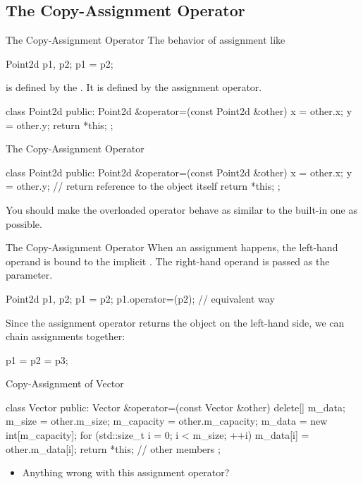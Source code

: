 \documentclass{beamer}
\begin{document}
\subsection{The Copy-Assignment Operator}

\begin{frame}[fragile]{The Copy-Assignment Operator}
    The behavior of assignment like
    \begin{cpp}
Point2d p1, p2;
p1 = p2;
    \end{cpp}
    is defined by the . It is defined by  the assignment operator.
    \begin{cpp}
class Point2d {
 public:
  Point2d &operator=(const Point2d &other) {
    x = other.x;
    y = other.y;
    return *this;
  }
};
    \end{cpp}
\end{frame}

\begin{frame}[fragile]{The Copy-Assignment Operator}
    \begin{cpp}
class Point2d {
 public:
  Point2d &operator=(const Point2d &other) {
    x = other.x;
    y = other.y;
    // return reference to the object itself
    return *this;
  }
};
    \end{cpp}
    \begin{notice}
        You should make the overloaded operator behave as similar to the built-in one as possible.
    \end{notice}
\end{frame}

\begin{frame}[fragile]{The Copy-Assignment Operator}
    When an assignment happens, the left-hand operand is bound to the implicit . The right-hand operand is passed as the parameter.
    \begin{cpp}
Point2d p1, p2;
p1 = p2;
p1.operator=(p2); // equivalent way
    \end{cpp}
    \pause
    Since the assignment operator returns the object on the left-hand side, we can chain assignments together:
    \begin{cpp}
p1 = p2 = p3;
    \end{cpp}
\end{frame}

\begin{frame}[fragile]{Copy-Assignment of Vector}
    \begin{cpp}
class Vector {
 public:
  Vector &operator=(const Vector &other) {
    delete[] m_data;
    m_size = other.m_size;
    m_capacity = other.m_capacity;
    m_data = new int[m_capacity];
    for (std::size_t i = 0; i < m_size; ++i)
      m_data[i] = other.m_data[i];
    return *this;
  }
  // other members
};
    \end{cpp}
    \pause
    \begin{itemize}
        \item Anything wrong with this assignment operator?
    \end{itemize}
\end{frame}
\end{document}
